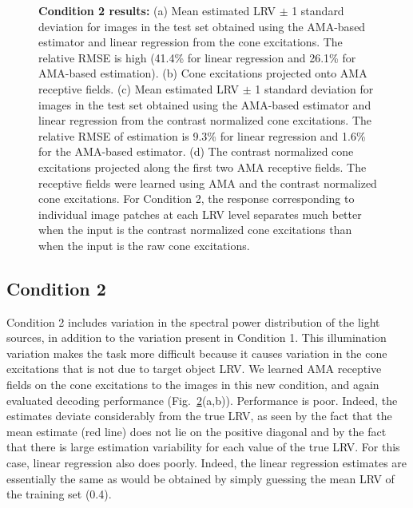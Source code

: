 \documentclass{jov}
\begin{document}
\begin{figure}
\begin{subfigure}[b]{0.22 \textwidth}
        \label{fig:case2RFResponseContrast}
    \end{subfigure}
    \caption{{\bf Condition 2 results:} (a) Mean estimated LRV $\pm$ 1 standard deviation for images in the test set obtained using the AMA-based estimator and linear regression from the cone excitations. The relative RMSE is high (41.4\% for linear regression and 26.1\% for AMA-based estimation). (b) Cone excitations projected onto AMA receptive fields. (c) Mean estimated LRV $\pm$ 1 standard deviation for images in the test set obtained using the AMA-based estimator and linear regression from the contrast normalized cone excitations. The relative RMSE of estimation is 9.3\% for linear regression and 1.6\% for the AMA-based estimator. (d) The contrast normalized cone excitations projected along the first two AMA receptive fields. The receptive fields were learned using AMA and the contrast normalized cone excitations. For Condition 2, the response corresponding to individual image patches at each LRV level separates much better when the input is the contrast normalized cone excitations than when the input is the raw cone excitations.}
\label{fig:Condition2}
\end{figure}

\subsection{Condition 2}

Condition 2 includes variation in the spectral power distribution of the light sources, in addition to the variation present in Condition 1. 
This illumination variation makes the task more difficult because it causes variation in the cone excitations that is not due to target object LRV. 
We learned AMA receptive fields on the cone excitations to the images in this new condition, and again evaluated decoding performance (Fig.~\ref{fig:Condition2}(a,b)). 
Performance is poor.
Indeed, the estimates deviate considerably from the true LRV, as seen by the fact that the mean estimate
(red line) does not lie on the positive diagonal and by the fact that there is large estimation variability for each
value of the true LRV.
For this case, linear regression also does poorly. Indeed, the linear regression estimates are essentially the same as would be obtained
by simply guessing the mean LRV of the training set (0.4).
\end{document}
